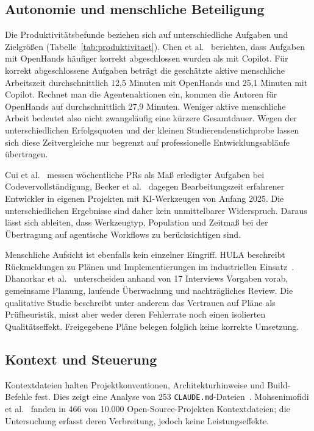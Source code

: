 \documentclass[conference]{IEEEtran}
\begin{document}
\subsection{Autonomie und menschliche Beteiligung}
Die Produktivitätsbefunde beziehen sich auf unterschiedliche Aufgaben und Zielgrößen (Tabelle~\ref{tab:produktivitaet}). Chen et al.~\cite{chen2025codewithme} berichten, dass Aufgaben mit OpenHands häufiger korrekt abgeschlossen wurden als mit Copilot. Für korrekt abgeschlossene Aufgaben beträgt die geschätzte aktive menschliche Arbeitszeit durchschnittlich 12,5 Minuten mit OpenHands und 25,1 Minuten mit Copilot. Rechnet man die Agentenaktionen ein, kommen die Autoren für OpenHands auf durchschnittlich 27,9 Minuten. Weniger aktive menschliche Arbeit bedeutet also nicht zwangsläufig eine kürzere Gesamtdauer. Wegen der unterschiedlichen Erfolgsquoten und der kleinen Studierendenstichprobe lassen sich diese Zeitvergleiche nur begrenzt auf professionelle Entwicklungsabläufe übertragen.

Cui et al.~\cite{cui2025genai} messen wöchentliche PRs als Maß erledigter Aufgaben bei Codevervollständigung, Becker et al.~\cite{becker2025metr} dagegen Bearbeitungszeit erfahrener Entwickler in eigenen Projekten mit KI-Werkzeugen von Anfang 2025. Die unterschiedlichen Ergebnisse sind daher kein unmittelbarer Widerspruch. Daraus lässt sich ableiten, dass Werkzeugtyp, Population und Zeitmaß bei der Übertragung auf agentische Workflows zu berücksichtigen sind.

Menschliche Aufsicht ist ebenfalls kein einzelner Eingriff. HULA beschreibt Rückmeldungen zu Plänen und Implementierungen im industriellen Einsatz~\cite{takerngsaksiri2025hula}. Dhanorkar et al.~\cite{dhanorkar2026oversight} unterscheiden anhand von 17 Interviews Vorgaben vorab, gemeinsame Planung, laufende Überwachung und nachträgliches Review. Die qualitative Studie beschreibt unter anderem das Vertrauen auf Pläne als Prüfheuristik, misst aber weder deren Fehlerrate noch einen isolierten Qualitätseffekt. Freigegebene Pläne belegen folglich keine korrekte Umsetzung.

\subsection{Kontext und Steuerung}
Kontextdateien halten Projektkonventionen, Architekturhinweise und Build-Befehle fest. Dies zeigt eine Analyse von 253 \texttt{CLAUDE.md}-Dateien~\cite{chatlatanagulchai2025manifests}. Mohsenimofidi et al.~\cite{mohsenimofidi2026context} fanden in 466 von 10.000 Open-Source-Projekten Kontextdateien; die Untersuchung erfasst deren Verbreitung, jedoch keine Leistungseffekte.
\end{document}
